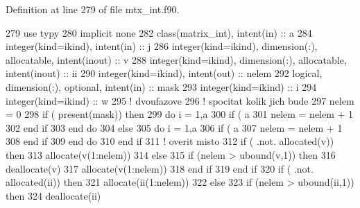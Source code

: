 Definition at line 279 of file mtx\+\_\+int.\+f90.


\begin{DoxyCode}
279     \textcolor{keywordtype}{use }typy
280     \textcolor{keywordtype}{implicit none}
282     \textcolor{keywordtype}{class}(matrix\_int), \textcolor{keywordtype}{intent(in)} :: a
284     \textcolor{keywordtype}{integer(kind=ikind)}, \textcolor{keywordtype}{intent(in)} :: j
286     \textcolor{keywordtype}{integer(kind=ikind)}, \textcolor{keywordtype}{dimension(:)}, \textcolor{keywordtype}{allocatable}, \textcolor{keywordtype}{intent(inout)} :: v
288     \textcolor{keywordtype}{integer(kind=ikind)}, \textcolor{keywordtype}{dimension(:)}, \textcolor{keywordtype}{allocatable}, \textcolor{keywordtype}{intent(inout)} :: ii
290     \textcolor{keywordtype}{integer(kind=ikind)}, \textcolor{keywordtype}{intent(out)} :: nelem
292     \textcolor{keywordtype}{logical}, \textcolor{keywordtype}{dimension(:)}, \textcolor{keywordtype}{optional}, \textcolor{keywordtype}{intent(in)} :: mask
293     \textcolor{keywordtype}{integer(kind=ikind)} :: i
294     \textcolor{keywordtype}{integer(kind=ikind)} :: w
295     \textcolor{comment}{! dvoufazove
}
296     \textcolor{comment}{! spocitat kolik jich bude
}
297     nelem = 0
298     \textcolor{keywordflow}{if} ( \textcolor{keyword}{present}(mask)) then
299         \textcolor{keywordflow}{do} i = 1,a%
300             \textcolor{keywordflow}{if} ( a%
301                 nelem = nelem + 1
302 \textcolor{keyword}{            end }if
303 \textcolor{keyword}{        end }do
304     else
305         \textcolor{keywordflow}{do} i = 1,a%
306             \textcolor{keywordflow}{if} ( a%
307                 nelem = nelem + 1
308 \textcolor{keyword}{            end }if
309 \textcolor{keyword}{        end }do
310 \textcolor{keyword}{    end }if
311     \textcolor{comment}{! overit misto
}
312     \textcolor{keywordflow}{if} ( .not. \textcolor{keyword}{allocated}(v)) then
313         \textcolor{keyword}{allocate}(v(1:nelem))
314     else
315         \textcolor{keywordflow}{if} (nelem > ubound(v,1)) then
316             \textcolor{keyword}{deallocate}(v)
317             \textcolor{keyword}{allocate}(v(1:nelem))
318 \textcolor{keyword}{        end }if
319 \textcolor{keyword}{    end }if
320     \textcolor{keywordflow}{if} ( .not. \textcolor{keyword}{allocated}(ii)) then
321         \textcolor{keyword}{allocate}(ii(1:nelem))
322     else
323         \textcolor{keywordflow}{if} (nelem > ubound(ii,1)) then
324             \textcolor{keyword}{deallocate}(ii)

\end{DoxyCode}
